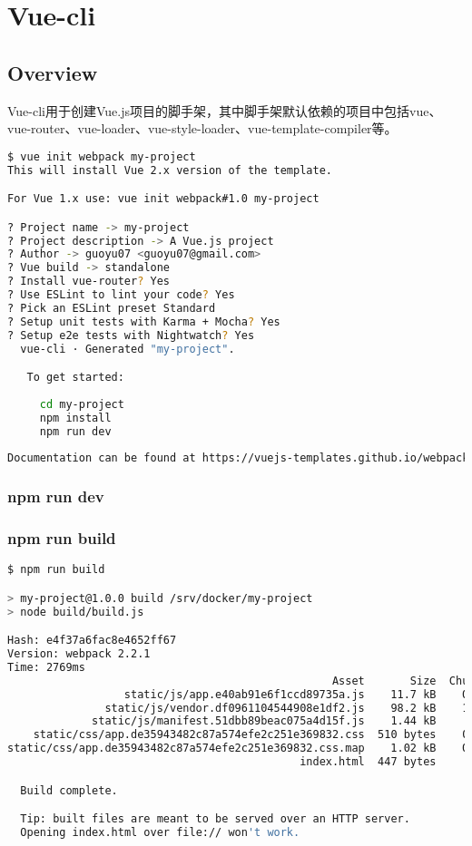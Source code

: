 \part{Vue-cli}

\chapter{Overview}

Vue-cli用于创建Vue.js项目的脚手架，其中脚手架默认依赖的项目中包括vue、vue-router、vue-loader、vue-style-loader、vue-template-compiler等。


\begin{lstlisting}[language=bash]
$ vue init webpack my-project
This will install Vue 2.x version of the template.

For Vue 1.x use: vue init webpack#1.0 my-project

? Project name -> my-project
? Project description -> A Vue.js project
? Author -> guoyu07 <guoyu07@gmail.com>
? Vue build -> standalone
? Install vue-router? Yes
? Use ESLint to lint your code? Yes
? Pick an ESLint preset Standard
? Setup unit tests with Karma + Mocha? Yes
? Setup e2e tests with Nightwatch? Yes
  vue-cli · Generated "my-project".

   To get started:
   
     cd my-project
     npm install
     npm run dev
   
Documentation can be found at https://vuejs-templates.github.io/webpack
\end{lstlisting}

\section{npm run dev}



\section{npm run build}


\begin{lstlisting}[language=bash]
$ npm run build

> my-project@1.0.0 build /srv/docker/my-project
> node build/build.js

Hash: e4f37a6fac8e4652ff67
Version: webpack 2.2.1
Time: 2769ms
                                                  Asset       Size  Chunks             Chunk Names
                  static/js/app.e40ab91e6f1ccd89735a.js    11.7 kB    0, 2  [emitted]  app
               static/js/vendor.df0961104544908e1df2.js    98.2 kB    1, 2  [emitted]  vendor
             static/js/manifest.51dbb89beac075a4d15f.js    1.44 kB       2  [emitted]  manifest
    static/css/app.de35943482c87a574efe2c251e369832.css  510 bytes    0, 2  [emitted]  app
static/css/app.de35943482c87a574efe2c251e369832.css.map    1.02 kB    0, 2  [emitted]  app
                                             index.html  447 bytes          [emitted]  

  Build complete.

  Tip: built files are meant to be served over an HTTP server.
  Opening index.html over file:// won't work.
\end{lstlisting}

